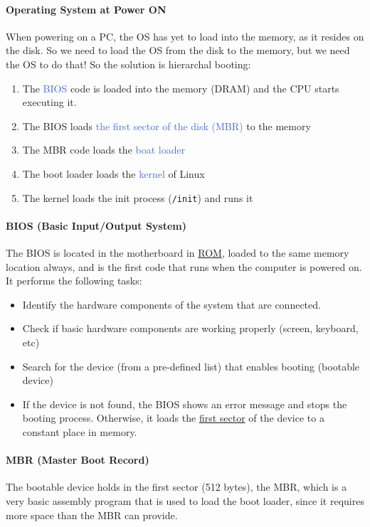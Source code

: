 \documentclass[openany,12pt]{book}
\newcommand{\code}[1]{\texttt{#1}}
\newcommand{\blue}[1]{\textcolor{RoyalBlue}{#1}}
\begin{document}
\paragraph{Operating System at Power ON} When powering on a PC, the OS has yet to load into the memory, as it resides on the disk. So we need to load the OS from the disk to the memory, but we need the OS to do that! So the solution is hierarchal booting: 
\begin{enumerate}
  \item The \blue{BIOS} code is loaded into the memory (DRAM) and the CPU starts executing it.

  \item The BIOS loads \blue{the first sector of the disk (MBR)} to the memory

  \item The MBR code loads the \blue{boat loader}

  \item The boot loader loads the \blue{kernel} of Linux

  \item The kernel loads the init process (\code{/init}) and runs it
\end{enumerate}


\paragraph{BIOS (Basic Input/Output System)} The BIOS is located in the motherboard in \ul{ROM}, loaded to the same memory location always, and is the first code that runs when the computer is powered on. It performs the following tasks:
\begin{itemize}
  \item Identify the hardware components of the system that are connected.
  \item Check if basic hardware components are working properly (screen, keyboard, etc)
  \item Search for the device (from a pre-defined list) that enables booting (bootable device)
  \item If the device is not found, the BIOS shows an error message and stops the booting process. Otherwise, it loads the \ul{first sector} of the device to a constant place in memory.
\end{itemize}


\paragraph{MBR (Master Boot Record)} The bootable device holds in the first sector (512 bytes), the MBR, which is a very basic assembly program that is used to load the boot loader, since it requires more space than the MBR can provide. 
\end{document}
